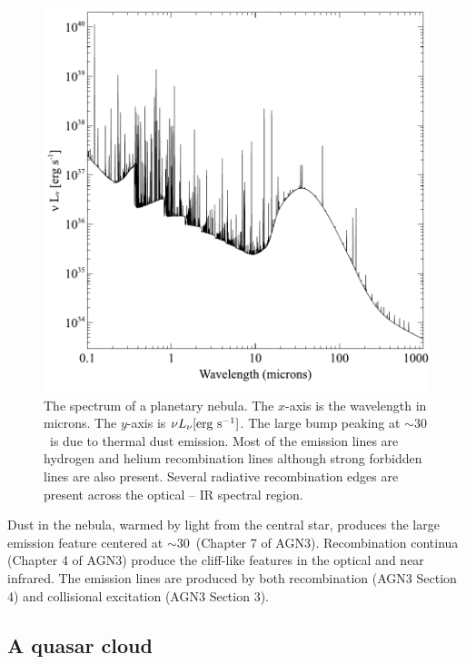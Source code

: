 \documentclass[12pt,twoside]{article}
\begin{document}
{\begin{figure}
\begin{center}
\includegraphics[clip=on,width=0.8\columnwidth,height=0.8\textheight,keepaspectratio]{PN_spectrum}
\end{center}
\caption{The spectrum of a planetary nebula.
The $x$-axis is the wavelength in microns.
The $y$-axis is $\nu L_\nu \rm{[erg\ s^{-1}]}$.
The large bump peaking at $\sim 30$\micron\ is
due to thermal dust emission.
Most of the emission lines are hydrogen and helium recombination lines
although strong forbidden lines are also present.
Several radiative recombination edges are present
across the optical -- IR spectral region.}
\label{fig:PN_spectrum}
\end{figure}

Dust in the nebula, warmed by light from the central star, produces the
large emission feature centered at $\sim 30$\micron\ (Chapter 7 of AGN3).
Recombination continua (Chapter 4 of AGN3) produce the cliff-like features
in the optical and near infrared.  The emission lines are produced by both
recombination (AGN3 Section 4) and collisional excitation (AGN3 Section
3).

\subsection{A quasar cloud}
\label{sec:QuasarCloud}

}
\end{document}
